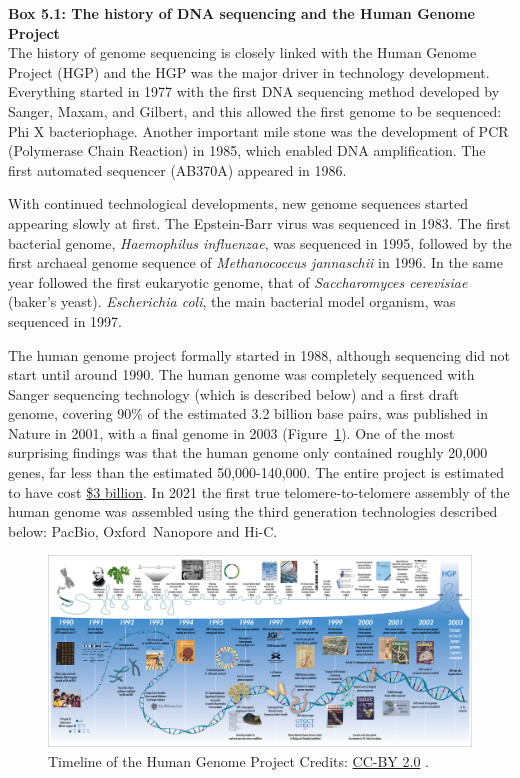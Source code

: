 \begin{framed}
\textbf{Box 5.1: The history of DNA sequencing and the Human Genome Project}\\
The history of genome sequencing is closely linked with the Human Genome
Project (HGP) and the HGP was the major driver in technology development.
Everything started in 1977 with the first DNA sequencing method developed
by Sanger, Maxam, and Gilbert, and this allowed the first genome to be
sequenced: Phi X bacteriophage.
Another important mile stone was the development of PCR (Polymerase Chain Reaction)
in 1985, which enabled DNA amplification. The first automated sequencer (AB370A)
appeared in 1986.

With continued technological developments, new genome sequences started appearing
slowly at first. The Epstein-Barr virus was sequenced in 1983. The first
bacterial genome, \textit{Haemophilus influenzae}, was sequenced in 1995, followed by the first
archaeal genome sequence of \textit{Methanococcus jannaschii} in 1996. In the same
year followed the first eukaryotic genome, that of \textit{Saccharomyces
cerevisiae} (baker's yeast). \textit{Escherichia coli}, the main bacterial model
organism, was sequenced in 1997.

The human genome project formally started in 1988, although sequencing did not start
until around 1990. The human genome was completely sequenced with Sanger sequencing
technology (which is described below) and a first draft genome, covering 90\%
of the estimated 3.2 billion base pairs, was published in Nature in 2001,
with a final genome in 2003 (Figure~\ref{landmarks_in_genetics}).
One of the most surprising findings was that the human genome only contained roughly 20,000 genes, far less than the
estimated 50,000-140,000. The entire project is estimated to have cost \href{https://www.genome.gov/about-genomics/educational-resources/fact-sheets/human-genome-project}{\$3
billion}.
In 2021 the first true telomere-to-telomere assembly of the human genome was
assembled using the third generation technologies described below: PacBio,
Oxford~Nanopore and Hi-C.

\begin{figure}[!htbp]
\centering
\includegraphics[width=0.7\linewidth]{files/Fig_Box1_Human_Genom-3c06ee6d5a13d224243c3d6e3f1f871c.jpg}
\caption[]{Timeline of the Human Genome Project \newline
Credits: \href{https://creativecommons.org/licenses/by/2.0}{CC-BY 2.0} \cite{timeline_HGP_2003}.}
\label{landmarks_in_genetics}
\end{figure}
\end{framed}

